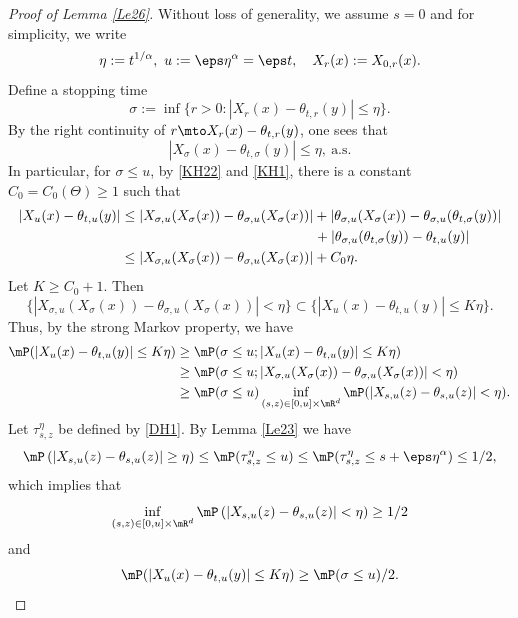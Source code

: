 \begin{proof}[Proof of Lemma \ref{Le26}]
Without loss of generality, we assume $s=0$ and for simplicity, we write
\[
\eta:=t^{1/\alpha},\ u:=\eps\eta^\alpha=\eps t,\quad X_r(x):=X_{0,r}(x).
\]
Define a stopping time
\[
\sigma:=\inf\bigl\{r>0: |X_{r}(x)-\theta_{t,r}(y)|\leq \eta\bigr\}.
\]
By the right continuity of $r\mto X_{r}(x)-\theta_{t,r}(y)$, one sees that
\[
|X_{\sigma}(x)-\theta_{t,\sigma}(y)|\leq \eta, \ \text{a.s.}
\]
In particular, for $\sigma\leq u$, by \eqref{KH22} and \eqref{KH1}, there is a constant $C_0=C_0(\Theta)\geq 1$ such that
\begin{align*}
|X_{u}(x)-\theta_{t,u}(y)|
&\leq |X_{\sigma,u}(X_{\sigma}(x))-\theta_{\sigma,u}(X_{\sigma}(x))|
+|\theta_{\sigma,u}(X_{\sigma}(x))-\theta_{\sigma,u}(\theta_{t,\sigma}(y))|
\\&\hspace*{4.87cm}+|\theta_{\sigma,u}(\theta_{t,\sigma}(y))-\theta_{t,u}(y)|
\\&\leq |X_{\sigma,u}(X_{\sigma}(x))-\theta_{\sigma,u}(X_{\sigma}(x))|+C_0\eta.
\end{align*}
Let $K\geq C_0+1$. Then
\[
\big\{|X_{\sigma,u}(X_{\sigma}(x))-\theta_{\sigma,u}(X_{\sigma}(x))|<\eta\big\}
\subset\big\{|X_{u}(x)-\theta_{t,u}(y)|\leq K\eta\big\}.
\]
Thus, by the strong Markov property, we have
\begin{align*}
\mP(|X_{u}(x)-\theta_{t,u}(y)|\leq K\eta)
&\geq \mP(\sigma\leq u; |X_{u}(x)-\theta_{t,u}(y)|\leq K\eta)
\\&\geq \mP(\sigma\leq u; |X_{\sigma,u}(X_{\sigma}(x))-\theta_{\sigma,u}(X_{\sigma}(x))|<\eta)
\\&\geq \mP(\sigma\leq u)\inf_{(s,z)\in[0,u]\times\mR^d}\mP(|X_{s,u}(z)-\theta_{s,u}(z)|<\eta).
\end{align*}
Let $\tau^\eta_{s,z}$ be defined by \eqref{DH1}.
By Lemma \ref{Le23} we have
\begin{equation}\label{Tau}
\mP\left(|X_{s,u}(z)-\theta_{s,u}(z)|\geq \eta\right)\leq \mP(\tau^\eta_{s,z}\leq u)
\leq \mP(\tau^\eta_{s,z}\leq s+\eps\eta^\alpha)\leq 1/2,
\end{equation}
which implies that
\begin{equation*}
\inf_{(s,z)\in[0,u]\times\mR^d}\mP\left(|X_{s,u}(z)-\theta_{s,u}(z)|<\eta\right)\geq 1/2
\end{equation*}
and
\begin{equation}\label{AA9}
\mP(|X_{u}(x)-\theta_{t,u}(y)|\leq K\eta)\geq \mP(\sigma\leq u)/2.
\end{equation}

\end{proof}
